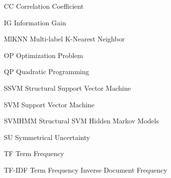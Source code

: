 \newcommand{\abbrlabel}[1]{\makebox[3cm][l]{\textbf{#1}}}
\newenvironment{abbreviations}{\begin{list}{}{\renewcommand{\makelabel}{\abbrlabel}}}{\end{list}}
\begin{abbreviations}
	\item[CC] Correlation Coefficient
	\item[IG] Information Gain
	\item[MlKNN] Multi-label K-Nearest Neighbor
	\item[OP] Optimization Problem
	\item[QP] Quadratic Programming
	\item[SSVM] Structural Support Vector Machine	
	\item[SVM] Support Vector Machine
	\item[SVMHMM] Structural SVM Hidden Markov Models
	\item[SU] Symmetrical Uncertainty
	\item[TF] Term Frequency
	\item[TF-IDF] Term Frequency Inverse Document Frequency
\end{abbreviations}
